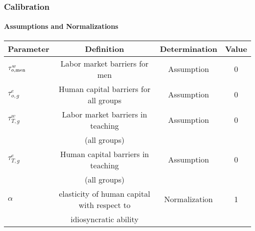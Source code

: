 \documentclass[11pt]{beamer}
\begin{document}
\begin{frame}
\frametitle{Calibration}
\framesubtitle{Assumptions and Normalizations}
\scriptsize
	
	\begin{table}[h!]
		\centering
		\begin{tabular}{lccc}
			\toprule
			\toprule
			Parameter & Definition & Determination & Value\\
			\midrule
			$\tau^{w}_{o,{\rm men}}$ & Labor market barriers for men & Assumption & 0 \\
			$\tau^{e}_{o,g}$ & Human capital barriers for all groups & Assumption & 0 \\
			$\tau^{w}_{T,g}$ & Labor market barriers in teaching  & Assumption & 0 \\
			& (all groups)&\\
			$\tau^{e}_{T,g}$ & Human capital barriers in teaching & Assumption & 0 \\
			& (all groups) & \\
			$\alpha$ & elasticity of human capital with respect to & Normalization & 1 \\
			& idiosyncratic ability & \\
			\bottomrule
		\end{tabular}
		\label{tab:assump}
	\end{table}
\end{frame}
\end{document}
